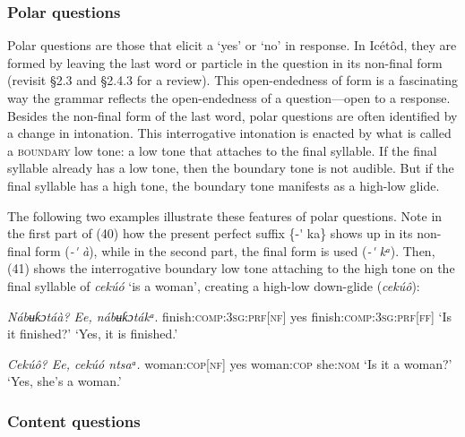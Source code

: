 \subsubsection{Polar questions}

Polar questions are those that elicit a ‘yes’ or ‘no’ in response. In Icétôd, they are formed by leaving the last word or particle in the question in its non-final form (revisit §2.3 and §2.4.3 for a review). This open-endedness of form is a fascinating way the grammar reflects the open-endedness of a question—open to a response. Besides the non-final form of the last word, polar questions are often identified by a change in intonation. This interrogative intonation is enacted by what is called a \textsc{boundary} low tone: a low tone that attaches to the final syllable. If the final syllable already has a low tone, then the boundary tone is not audible. But if the final syllable has a high tone, the boundary tone manifests as a high-low glide. 

The following two examples illustrate these features of polar questions. Note in the first part of (40) how the present perfect suffix \{-\'{} ka\} shows up in its non-final form (\textit{{}-\'{} à}), while in the second part, the final form is used (\textit{{}-\'{} kᵃ}). Then, (41) shows the interrogative boundary low tone attaching to the high tone on the final syllable of \textit{cekúó} ‘is a woman’, creating a high-low down-glide (\textit{cekúô}):




\textit{Nábʉƙɔtá}\textit{à}\textit{?      Ee, nábʉƙɔtá}\textit{kᵃ}.
finish:\textsc{comp:3sg:prf}[\textsc{nf}]  yes finish:\textsc{comp:3sg:prf[ff]}
‘Is it finished?’    ‘Yes, it is finished.’




\textit{Cekú}\textit{ô}\textit{?      Ee, cekúó     ntsaᵃ.}
woman:\textsc{cop[nf]}    yes woman:\textsc{cop}   she:\textsc{nom}
‘Is it a woman?’    ‘Yes, she’s a woman.’




\subsubsection{Content questions}


